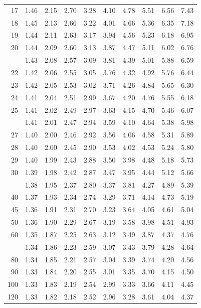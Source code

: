 \documentclass[10pt]{article}
\begin{document}
\begin{longtable}{@{}r!{\vrule width 0.8pt\hspace{0.55em}}rrrrrrrrr@{}}
17 & 1.46 & 2.15 & 2.70 & 3.28 & 4.10 & 4.78 & 5.51 & 6.56 & 7.43 \\
18 & 1.45 & 2.13 & 2.66 & 3.22 & 4.01 & 4.66 & 5.36 & 6.35 & 7.18 \\
19 & 1.44 & 2.11 & 2.63 & 3.17 & 3.94 & 4.56 & 5.23 & 6.18 & 6.95 \\
20 & 1.44 & 2.09 & 2.60 & 3.13 & 3.87 & 4.47 & 5.11 & 6.02 & 6.76 \\
 & 1.43 & 2.08 & 2.57 & 3.09 & 3.81 & 4.39 & 5.01 & 5.88 & 6.59 \\
22 & 1.42 & 2.06 & 2.55 & 3.05 & 3.76 & 4.32 & 4.92 & 5.76 & 6.44 \\
23 & 1.42 & 2.05 & 2.53 & 3.02 & 3.71 & 4.26 & 4.84 & 5.65 & 6.30 \\
24 & 1.41 & 2.04 & 2.51 & 2.99 & 3.67 & 4.20 & 4.76 & 5.55 & 6.18 \\
25 & 1.41 & 2.02 & 2.49 & 2.97 & 3.63 & 4.15 & 4.70 & 5.46 & 6.07 \\
 & 1.41 & 2.01 & 2.47 & 2.94 & 3.59 & 4.10 & 4.64 & 5.38 & 5.98 \\
27 & 1.40 & 2.00 & 2.46 & 2.92 & 3.56 & 4.06 & 4.58 & 5.31 & 5.89 \\
28 & 1.40 & 2.00 & 2.45 & 2.90 & 3.53 & 4.02 & 4.53 & 5.24 & 5.80 \\
29 & 1.40 & 1.99 & 2.43 & 2.88 & 3.50 & 3.98 & 4.48 & 5.18 & 5.73 \\
30 & 1.39 & 1.98 & 2.42 & 2.87 & 3.47 & 3.95 & 4.44 & 5.12 & 5.66 \\
 & 1.38 & 1.95 & 2.37 & 2.80 & 3.37 & 3.81 & 4.27 & 4.89 & 5.39 \\
40 & 1.37 & 1.93 & 2.34 & 2.74 & 3.29 & 3.71 & 4.14 & 4.73 & 5.19 \\
45 & 1.36 & 1.91 & 2.31 & 2.70 & 3.23 & 3.64 & 4.05 & 4.61 & 5.04 \\
50 & 1.36 & 1.90 & 2.29 & 2.67 & 3.19 & 3.58 & 3.98 & 4.51 & 4.93 \\
60 & 1.35 & 1.87 & 2.25 & 2.63 & 3.12 & 3.49 & 3.87 & 4.37 & 4.76 \\
 & 1.34 & 1.86 & 2.23 & 2.59 & 3.07 & 3.43 & 3.79 & 4.28 & 4.64 \\
80 & 1.34 & 1.85 & 2.21 & 2.57 & 3.04 & 3.39 & 3.74 & 4.20 & 4.56 \\
90 & 1.33 & 1.84 & 2.20 & 2.55 & 3.01 & 3.35 & 3.70 & 4.15 & 4.50 \\
100 & 1.33 & 1.83 & 2.19 & 2.54 & 2.99 & 3.33 & 3.66 & 4.11 & 4.45 \\
120 & 1.33 & 1.82 & 2.18 & 2.52 & 2.96 & 3.28 & 3.61 & 4.04 & 4.37 \\

\end{longtable}
\end{document}
